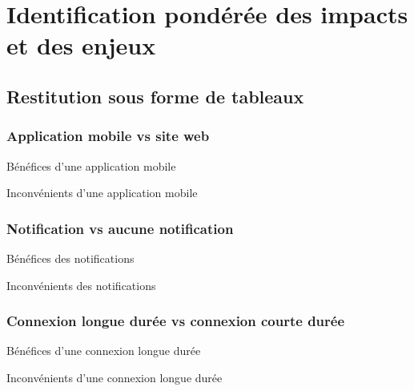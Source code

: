 \section{Identification pondérée des impacts et des enjeux}
	\subsection{Restitution sous forme de tableaux}
		\subsubsection{Application mobile vs site web}
		\lipsumC
	
		\begin{sidewaystable}[p]
			\centering
			\caption{Bénéfices d'une application mobile}
			\label{tab.app+}
			
		\bigskip\bigskip
			\centering
			\caption{Inconvénients d'une application mobile}
			\label{tab.app-}
			
		\end{sidewaystable}
		
		\subsubsection{Notification vs aucune notification}
		\lipsumC
	
		\begin{sidewaystable}[p]
			\centering
			\caption{Bénéfices des notifications}
			\label{tab.notif+}
			
		\bigskip\bigskip
			\centering
			\caption{Inconvénients des notifications}
			\label{tab.notif-}
			
		\end{sidewaystable}
		
		\subsubsection{Connexion longue durée vs connexion courte durée}
		\lipsumC
	
		\begin{sidewaystable}[p]
			\centering
			\caption{Bénéfices d'une connexion longue durée}
			\label{tab.connexion+}
			
		\bigskip\bigskip
			\centering
			\caption{Inconvénients d'une connexion longue durée}
			
			\label{tab.connexion-}
		\end{sidewaystable}
		
